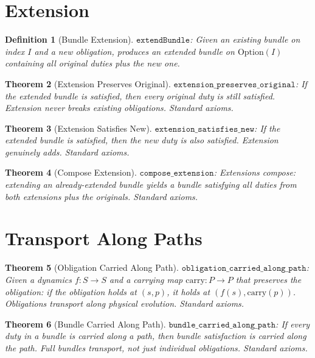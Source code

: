 \documentclass[12pt,a4paper]{article}
\newtheorem{theorem}{Theorem}[section]
\newtheorem{definition}[theorem]{Definition}
\begin{document}
\section{Extension}

\begin{definition}[Bundle Extension]
$\texttt{extendBundle}$: Given an existing bundle on index $I$ and a new
obligation, produces an extended bundle on $\text{Option}(I)$ containing
all original duties plus the new one.
\end{definition}

\begin{theorem}[Extension Preserves Original]\label{thm:preserves}
$\texttt{extension\_preserves\_original}$: If the extended bundle is
satisfied, then every original duty is still satisfied. Extension never
breaks existing obligations. Standard axioms.
\end{theorem}

\begin{theorem}[Extension Satisfies New]\label{thm:satisfies-new}
$\texttt{extension\_satisfies\_new}$: If the extended bundle is satisfied,
then the new duty is also satisfied. Extension genuinely adds.
Standard axioms.
\end{theorem}

\begin{theorem}[Compose Extension]\label{thm:compose}
$\texttt{compose\_extension}$: Extensions compose: extending an already-extended
bundle yields a bundle satisfying all duties from both extensions plus the
originals. Standard axioms.
\end{theorem}

\section{Transport Along Paths}

\begin{theorem}[Obligation Carried Along Path]\label{thm:carried}
$\texttt{obligation\_carried\_along\_path}$: Given a dynamics $f : S \to S$
and a carrying map $\text{carry} : P \to P$ that preserves the obligation:
if the obligation holds at $(s, p)$, it holds at $(f(s), \text{carry}(p))$.
Obligations transport along physical evolution. Standard axioms.
\end{theorem}

\begin{theorem}[Bundle Carried Along Path]\label{thm:bundle-carried}
$\texttt{bundle\_carried\_along\_path}$: If every duty in a bundle is
carried along a path, then bundle satisfaction is carried along the path.
Full bundles transport, not just individual obligations. Standard axioms.
\end{theorem}
\end{document}

